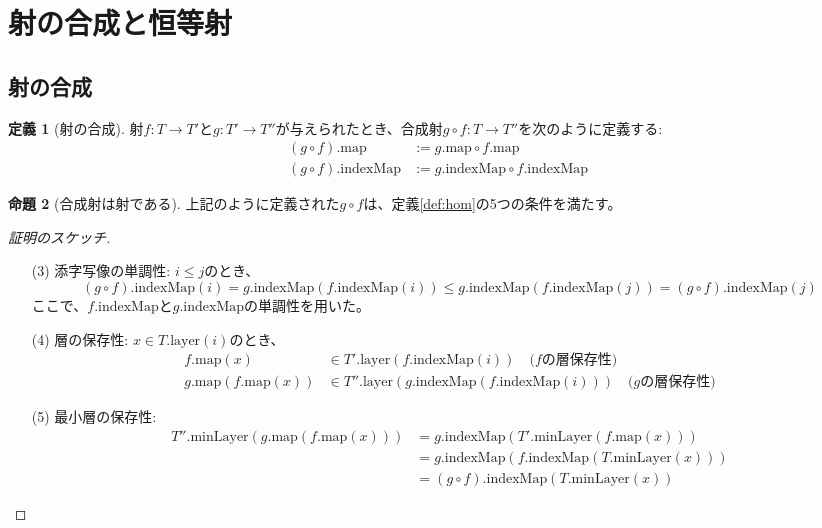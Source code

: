 \documentclass[a4paper,12pt]{article}
\theoremstyle{definition}
\newtheorem{definition}{定義}[section]
\newtheorem{proposition}[definition]{命題}
\begin{document}
\section{射の合成と恒等射}

\subsection{射の合成}

\begin{definition}[射の合成]\label{def:comp}
射$f : T \to T'$と$g : T' \to T''$が与えられたとき、合成射$g \circ f : T \to T''$を次のように定義する:
\begin{align*}
(g \circ f).\text{map} &:= g.\text{map} \circ f.\text{map} \\
(g \circ f).\text{indexMap} &:= g.\text{indexMap} \circ f.\text{indexMap}
\end{align*}
\end{definition}

\begin{proposition}[合成射は射である]
上記のように定義された$g \circ f$は、定義\ref{def:hom}の5つの条件を満たす。
\end{proposition}

\begin{proof}[証明のスケッチ]
\begin{enumerate}
\item[(3)] 添字写像の単調性: $i \leq j$のとき、
\[
(g \circ f).\text{indexMap}(i) = g.\text{indexMap}(f.\text{indexMap}(i)) \leq g.\text{indexMap}(f.\text{indexMap}(j)) = (g \circ f).\text{indexMap}(j)
\]
ここで、$f.\text{indexMap}$と$g.\text{indexMap}$の単調性を用いた。

\item[(4)] 層の保存性: $x \in T.\text{layer}(i)$のとき、
\begin{align*}
f.\text{map}(x) &\in T'.\text{layer}(f.\text{indexMap}(i)) \quad \text{($f$の層保存性)} \\
g.\text{map}(f.\text{map}(x)) &\in T''.\text{layer}(g.\text{indexMap}(f.\text{indexMap}(i))) \quad \text{($g$の層保存性)}
\end{align*}

\item[(5)] 最小層の保存性:
\begin{align*}
T''.\text{minLayer}(g.\text{map}(f.\text{map}(x))) &= g.\text{indexMap}(T'.\text{minLayer}(f.\text{map}(x))) \\
&= g.\text{indexMap}(f.\text{indexMap}(T.\text{minLayer}(x))) \\
&= (g \circ f).\text{indexMap}(T.\text{minLayer}(x))
\end{align*}
\end{enumerate}
\end{proof}
\end{document}
